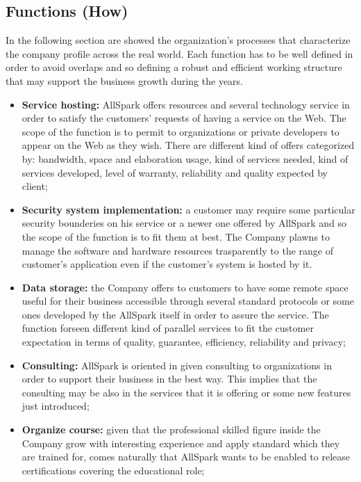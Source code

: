 \subsection{Functions (How)}
\label{subsec:scope[Functions]}
In the following section are showed the organization's processes that characterize the company profile across the real world. Each function has to be well defined in order to avoid overlaps and so defining a robust and efficient working structure that may support the business growth during the years.
\begin{itemize}
  \item {\bf Service hosting:} AllSpark offers resources and several technology service in order to satisfy the customers' requests of having a service on the Web. The scope of the function is to permit to organizations or private developers to appear on the Web as they wish. There are different kind of offers categorized by: bandwidth, space and elaboration usage, kind of services needed, kind of services developed, level of warranty, reliability and quality expected by client;
  \item {\bf Security system implementation:} a customer may require some particular security bounderies on his service or a newer one offered by AllSpark and so the scope of the function is to fit them at best. The Company plawns to manage the software and hardware resources trasparently to the range of customer's application even if the customer's system is hosted by it.
  \item {\bf Data storage:} the Company offers to customers to have some remote space useful for their business accessible through several standard protocols or some ones developed by the AllSpark itself in order to assure the service. The function forseen different kind of parallel services to fit the customer expectation in terms of quality, guarantee, efficiency, reliability and privacy;
  \item {\bf Consulting:} AllSpark is oriented in given consulting to organizations in order to support their business in the best way. This implies that the consulting may be also in the services that it is offering or some new features just introduced;
  \item {\bf Organize course:} given that the professional skilled figure inside the Company grow with interesting experience and apply standard which they are trained for, comes naturally that AllSpark wants to be enabled to release certifications covering the educational role;

\end{itemize}
